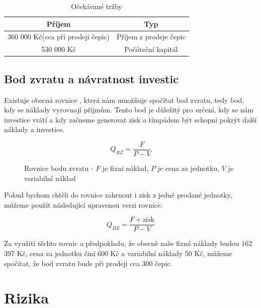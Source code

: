\documentclass[12pt, a4paper]{article}
\begin{document}
\begin{table}[h]
  \centering
  \begin{tabular}{ | c | c | }
    \hline
    \textbf{Příjem} & \textbf{Typ} \\
    \hline \hline
    360 000 Kč(cca při prodeji čepic) & Příjem z prodeje čepic \\
    \hline
    530 000 Kč & Počáteční kapitál \\
    \hline
  \end{tabular}
  \caption{Očekávané tržby}
\end{table}

\subsection{Bod zvratu a návratnost investic}

Existuje obecná rovnice \cite{bod-zvratu}, která nám umožňuje spočítat bod zvratu, tedy bod, kdy se náklady vyrovnají příjmům.
Tento bod je důležitý pro určení, kdy se nám investice vrátí a kdy začneme generovat zisk a tímpádem
být schopni pokrýt další náklady a investice.

\begin{figure}[h!]
  \centering
  \captionsetup{justification=centering}
  \begin{equation}
    Q_{BZ}=\frac{F}{P-V}
  \end{equation}
  \caption{Rovnice bodu zvratu - $F$ je fixní náklad, $P$ je cena za jednotku, $V$ je variabilní náklad}
\end{figure}

\noindent Pokud bychom chtěli do rovnice zahrnout i zisk z jedné prodané jednotky, můžeme použít následující upravenou verzi rovnice:

\begin{figure}[h!]
  \centering
  \captionsetup{justification=centering}
  \begin{equation}
    Q_{BZ}=\frac{F+\text{zisk}}{P-V}
  \end{equation}
\end{figure}

\noindent Za využití těchto rovnic a předpokladu,
že obecně naše fixná náklady budou 162 397 Kč, cena za jednotku
činí 600 Kč a variabilní náklady 50 Kč, můžeme spočítat, že bod zvratu
bude při prodeji cca 300 čepic.

\section{Rizika}
\end{document}
